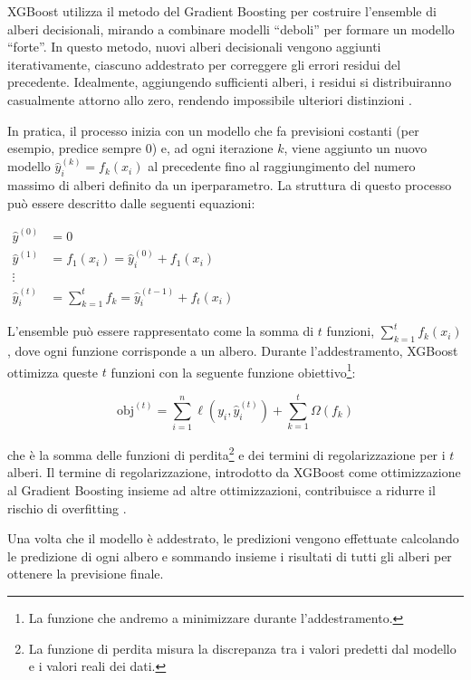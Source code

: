 XGBoost utilizza il metodo del Gradient Boosting per costruire l'ensemble di
alberi decisionali, mirando a combinare modelli ``deboli'' per formare un
modello ``forte''. In questo metodo, nuovi alberi decisionali vengono aggiunti
iterativamente, ciascuno addestrato per correggere gli errori residui del
precedente. Idealmente, aggiungendo sufficienti alberi, i residui si
distribuiranno casualmente attorno allo zero, rendendo impossibile ulteriori
distinzioni \cite{breiman1997, friedman2001}.

In pratica, il processo inizia con un modello che fa previsioni costanti (per
esempio, predice sempre 0) e, ad ogni iterazione $k$, viene aggiunto un nuovo
modello $\hat{y}_i^{(k)}=f_k(x_i)$ al precedente fino al raggiungimento del
numero massimo di alberi definito da un iperparametro. La struttura di questo
processo può essere descritto dalle seguenti equazioni:

\begin{center}
    \begin{math}
        \begin{aligned}
            \hat{y}^{(0)} &=0 \\ 
            \hat{y}^{(1)}&=f_1(x_i)=\hat{y}_i^{(0)}+f_1(x_i)\\ 
            \vdots \\ 
            \hat{y}_i^{(t)}&=\sum_{k=1}^{t}f_k=\hat{y}_i^{(t-1)}+f_t(x_i)
        \end{aligned}
    \end{math}
\end{center}

L'ensemble può essere rappresentato come la somma di $t$ funzioni,
$\sum_{k=1}^{t}f_k(x_i)$, dove ogni funzione corrisponde a un albero. Durante
l'addestramento, XGBoost ottimizza queste $t$ funzioni con la seguente
funzione obiettivo\footnote{La funzione che andremo a minimizzare durante
l'addestramento.}:

$$\text{obj}^{(t)}=\displaystyle\sum_{i=1}^{n}\ell(y_i,\hat{y}_i^{(t)})+\displaystyle\sum_{k=1}^{t}\Omega(f_k)$$

che è la somma delle funzioni di perdita\footnote{La funzione di perdita
misura la discrepanza tra i valori predetti dal modello e i valori reali dei
dati.} e dei termini di regolarizzazione per i $t$ alberi. Il termine di
regolarizzazione, introdotto da XGBoost come ottimizzazione al Gradient
Boosting insieme ad altre ottimizzazioni, contribuisce a ridurre il rischio di
overfitting \cite{chen2016}. 

Una volta che il modello è addestrato, le predizioni vengono effettuate
calcolando le predizione di ogni albero e sommando insieme i risultati di
tutti gli alberi per ottenere la previsione finale.

